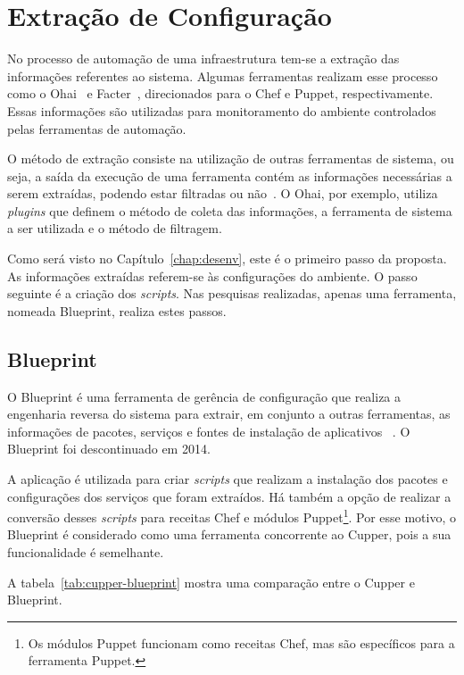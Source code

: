 \section{Extração de Configuração}

No processo de automação de uma infraestrutura tem-se a extração das
informações referentes ao sistema. Algumas ferramentas realizam esse
processo como o Ohai~\cite{ohaidoc:2016} e Facter~\cite{facterdoc:2016},
direcionados para o Chef e Puppet, respectivamente. Essas informações
são utilizadas para monitoramento do ambiente controlados pelas ferramentas
de automação.

O método de extração consiste na utilização de outras ferramentas de sistema,
ou seja, a saída da execução de uma ferramenta contém as informações necessárias
a serem extraídas, podendo estar filtradas ou não~\cite{ohaidoc:2016}. O Ohai,
por exemplo, utiliza \textit{plugins} que definem o método de coleta das informações,
a ferramenta de sistema a ser utilizada e o método de filtragem.

Como será visto no Capítulo~\ref{chap:desenv}, este é o primeiro passo da proposta.
As informações extraídas referem-se às configurações do ambiente. O passo
seguinte é a criação dos \textit{scripts}. Nas pesquisas realizadas, apenas uma ferramenta,
nomeada Blueprint, realiza estes passos.

\subsection{Blueprint}

O Blueprint é uma ferramenta de gerência de configuração que realiza a
engenharia reversa do sistema para extrair, em conjunto a outras ferramentas,
as informações de pacotes, serviços e fontes de instalação de aplicativos
~\cite{blueprint:2016}. O Blueprint foi descontinuado em 2014.

A aplicação é utilizada para criar \textit{scripts} que realizam
a instalação dos pacotes e configurações dos serviços que foram extraídos. Há
também a opção de realizar a conversão desses \textit{scripts} para receitas Chef e módulos
Puppet\footnote{Os módulos Puppet funcionam como receitas Chef, mas são específicos para a ferramenta Puppet.}.
Por esse motivo, o Blueprint é considerado como uma ferramenta concorrente ao Cupper,
pois a sua funcionalidade é semelhante.

A tabela~\ref{tab:cupper-blueprint} mostra uma comparação entre o Cupper e Blueprint.

